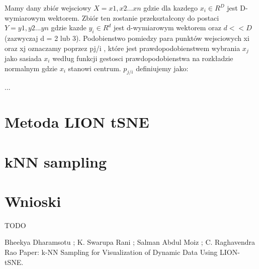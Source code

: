 \documentclass{article}
\begin{document}
Mamy dany zbiór wejsciowy $X = {x1, x2...xn}$ gdzie dla kazdego $x_i \in R^{D}$
jest D-wymiarowym wektorem. Zbiór ten zostanie przekształcony do
postaci $Y = {y1, y2...yn}$ gdzie kazde $y_i \in R^d$ jest d-wymiarowym
wektorem oraz $d << D$ (zazwyczaj d = 2 lub 3). Podobienstwo pomiedzy
para punktów wejsciowych xi oraz xj oznaczamy poprzez pj/i , które jest
prawdopodobienstwem wybrania $x_j$ jako sasiada $x_i$ według funkcji gestosci
prawdopodobienstwa na rozkładzie normalnym gdzie $x_i$ stanowi centrum.
$p_{j/i}$ definiujemy jako:

...

\section{Metoda LION tSNE}
\label{sec:lionTSNE}
\paragraph{}

\section{kNN sampling}
\label{sec:kNN}
\paragraph{}

\section{Wnioski}
\label{sec:conclusions}
TODO

  


\clearpage
\renewcommand\refname{Źródła}
\begin{thebibliography}{1}

Bheekya Dharamsotu ; K. Swarupa Rani ; Salman Abdul Moiz ; C. Raghavendra Rao
\newblock Paper: k-NN Sampling for Visualization of Dynamic Data Using LION-tSNE. 

\end{thebibliography}
\end{document}
